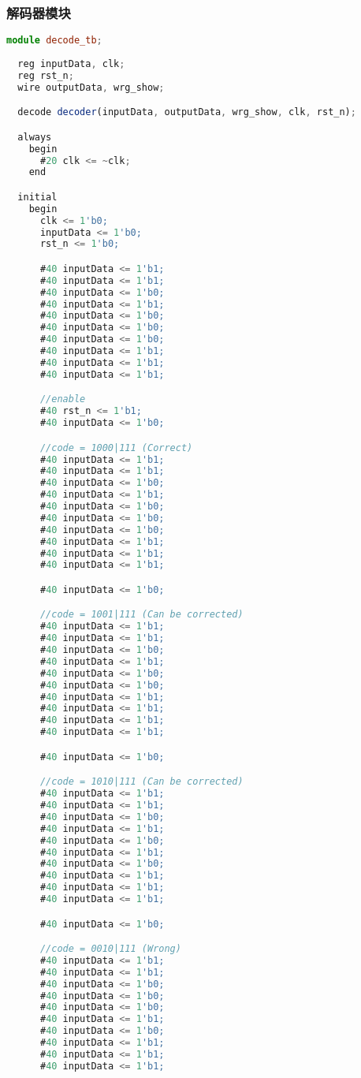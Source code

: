 \documentclass{progartcn}
\begin{document}
\subsubsection{解码器模块}
\begin{lstlisting}[language=TypeScript,caption={decode\_tb.v}]
module decode_tb;
  
  reg inputData, clk;
  reg rst_n;
  wire outputData, wrg_show;

  decode decoder(inputData, outputData, wrg_show, clk, rst_n);

  always
    begin
      #20 clk <= ~clk;
    end

  initial
    begin
      clk <= 1'b0;
      inputData <= 1'b0;
      rst_n <= 1'b0;

      #40 inputData <= 1'b1;
      #40 inputData <= 1'b1;
      #40 inputData <= 1'b0;
      #40 inputData <= 1'b1;
      #40 inputData <= 1'b0;
      #40 inputData <= 1'b0;
      #40 inputData <= 1'b0;
      #40 inputData <= 1'b1;
      #40 inputData <= 1'b1;
      #40 inputData <= 1'b1;

      //enable
      #40 rst_n <= 1'b1;
      #40 inputData <= 1'b0;

      //code = 1000|111 (Correct)
      #40 inputData <= 1'b1;
      #40 inputData <= 1'b1;
      #40 inputData <= 1'b0;
      #40 inputData <= 1'b1;
      #40 inputData <= 1'b0;
      #40 inputData <= 1'b0;
      #40 inputData <= 1'b0;
      #40 inputData <= 1'b1;
      #40 inputData <= 1'b1;
      #40 inputData <= 1'b1;

      #40 inputData <= 1'b0;

      //code = 1001|111 (Can be corrected)
      #40 inputData <= 1'b1;
      #40 inputData <= 1'b1;
      #40 inputData <= 1'b0;
      #40 inputData <= 1'b1;
      #40 inputData <= 1'b0;
      #40 inputData <= 1'b0;
      #40 inputData <= 1'b1;
      #40 inputData <= 1'b1;
      #40 inputData <= 1'b1;
      #40 inputData <= 1'b1;

      #40 inputData <= 1'b0;

      //code = 1010|111 (Can be corrected)
      #40 inputData <= 1'b1;
      #40 inputData <= 1'b1;
      #40 inputData <= 1'b0;
      #40 inputData <= 1'b1;
      #40 inputData <= 1'b0;
      #40 inputData <= 1'b1;
      #40 inputData <= 1'b0;
      #40 inputData <= 1'b1;
      #40 inputData <= 1'b1;
      #40 inputData <= 1'b1;

      #40 inputData <= 1'b0;

      //code = 0010|111 (Wrong)
      #40 inputData <= 1'b1;
      #40 inputData <= 1'b1;
      #40 inputData <= 1'b0;
      #40 inputData <= 1'b0;
      #40 inputData <= 1'b0;
      #40 inputData <= 1'b1;
      #40 inputData <= 1'b0;
      #40 inputData <= 1'b1;
      #40 inputData <= 1'b1;
      #40 inputData <= 1'b1;


\end{lstlisting}
\end{document}
